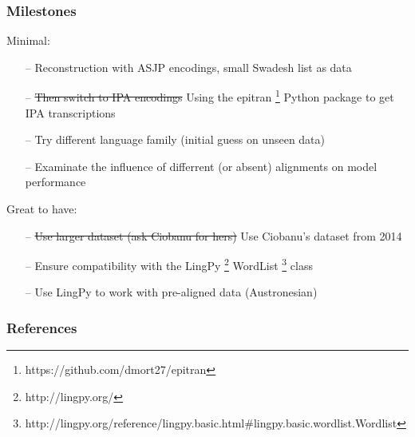 \documentclass[11pt]{beamer}
\begin{document}
\begin{frame}
    \frametitle{Milestones}
    Minimal:
    \begin{itemize}
        \item[--] Reconstruction with ASJP encodings, small Swadesh list as data 
        \item[--] \sout{Then switch to IPA encodings}  Using the epitran \footnote{https://github.com/dmort27/epitran} Python package to get IPA transcriptions
        \item[--] Try different language family (initial guess on unseen data)
        \item[--] Examinate the influence of differrent (or absent) alignments on model performance  
    \end{itemize}    
    Great to have:
    \begin{itemize}
        \item[--] \sout{Use larger dataset (ask Ciobanu for hers)} Use Ciobanu's dataset from 2014
        \item[--] Ensure compatibility with the LingPy \footnote{http://lingpy.org/} WordList 
        \footnote{http://lingpy.org/reference/lingpy.basic.html\#lingpy.basic.wordlist.Wordlist} class
        \item[--] Use LingPy to work with pre-aligned data (Austronesian)
    \end{itemize}
\end{frame}

\begin{frame}
    \frametitle{References}
    
\end{frame}
\end{document}
